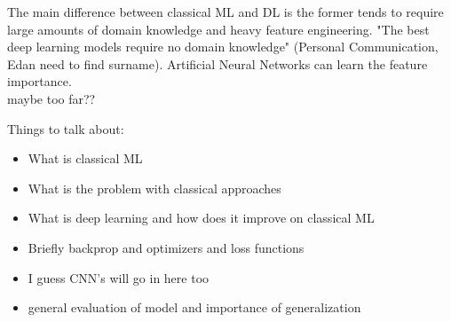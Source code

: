 
The main difference between classical ML and DL is the former tends to require large amounts of domain knowledge and heavy feature engineering. "The best deep learning models require no domain knowledge" (Personal Communication, Edan need to find surname). 
Artificial Neural Networks can learn the feature importance. \\

maybe too far??


Things to talk about:
\begin{itemize}
	\item What is classical ML
	\item What is the problem with classical approaches
	\item What is deep learning and how does it improve on classical ML
	\item Briefly backprop and optimizers and loss functions
	\item I guess CNN's will go in here too
	\item general evaluation of model and importance of generalization
\end{itemize}
